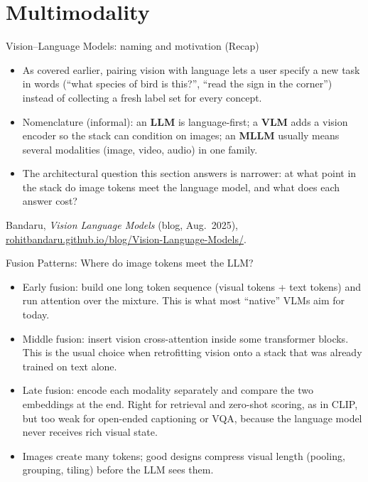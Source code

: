 \section{Multimodality}

\begin{frame}[t]{Vision--Language Models: naming and motivation (Recap)}
  \begin{itemize}\itemsep0.4em
    \item As covered earlier, pairing vision with language lets a user specify a new task in words (``what species of bird is this?'', ``read the sign in the corner'') instead of collecting a fresh label set for every concept.
    \item Nomenclature (informal): an \textbf{LLM} is language-first; a \textbf{VLM} adds a vision encoder so the stack can condition on images; an \textbf{MLLM} usually means several modalities (image, video, audio) in one family.
    \item The architectural question this section answers is narrower: at what point in the stack do image tokens meet the language model, and what does each answer cost?
  \end{itemize}
  \vfill
  {\scriptsize Bandaru, \textit{Vision Language Models} (blog, Aug.\ 2025), \href{https://rohitbandaru.github.io/blog/Vision-Language-Models/}{rohitbandaru.github.io/blog/Vision-Language-Models/}.}
\end{frame}

\begin{frame}[t]{Fusion Patterns: Where do image tokens meet the LLM?}
  \begin{itemize}
    \item Early fusion: build one long token sequence (visual tokens + text tokens) and run attention over the mixture. This is what most ``native'' VLMs aim for today.
    \item Middle fusion: insert vision cross-attention inside some transformer blocks. This is the usual choice when retrofitting vision onto a stack that was already trained on text alone.
    \item Late fusion: encode each modality separately and compare the two embeddings at the end. Right for retrieval and zero-shot scoring, as in CLIP, but too weak for open-ended captioning or VQA, because the language model never receives rich visual state.
    \item Images create many tokens; good designs compress visual length (pooling, grouping, tiling) before the LLM sees them.
  \end{itemize}
\end{frame}

